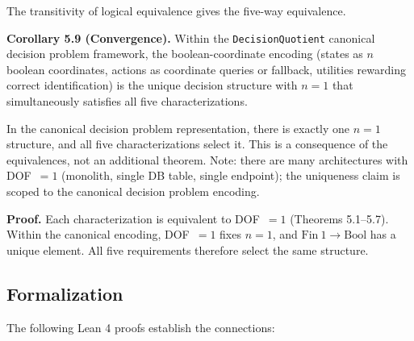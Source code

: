 The transitivity of logical equivalence gives the five-way equivalence.


\begin{formal}
\textbf{Corollary 5.9 (Convergence).} Within the \nolinkurl{DecisionQuotient} canonical decision problem framework, the boolean-coordinate encoding (states as $n$ boolean coordinates, actions as coordinate queries or fallback, utilities rewarding correct identification) is the unique decision structure with $n = 1$ that simultaneously satisfies all five characterizations.
\end{formal}

\begin{informal}
In the canonical decision problem representation, there is exactly one $n=1$ structure, and all five characterizations select it. This is a consequence of the equivalences, not an additional theorem. Note: there are many architectures with DOF~$=1$ (monolith, single DB table, single endpoint); the uniqueness claim is scoped to the canonical decision problem encoding.
\end{informal}

\textbf{Proof.} Each characterization is equivalent to DOF~$= 1$ (Theorems 5.1--5.7). Within the canonical encoding, DOF~$= 1$ fixes $n = 1$, and $\mathrm{Fin}\ 1 \to \mathrm{Bool}$ has a unique element. All five requirements therefore select the same structure.


\subsection{Formalization}

The following Lean 4 proofs establish the connections:

